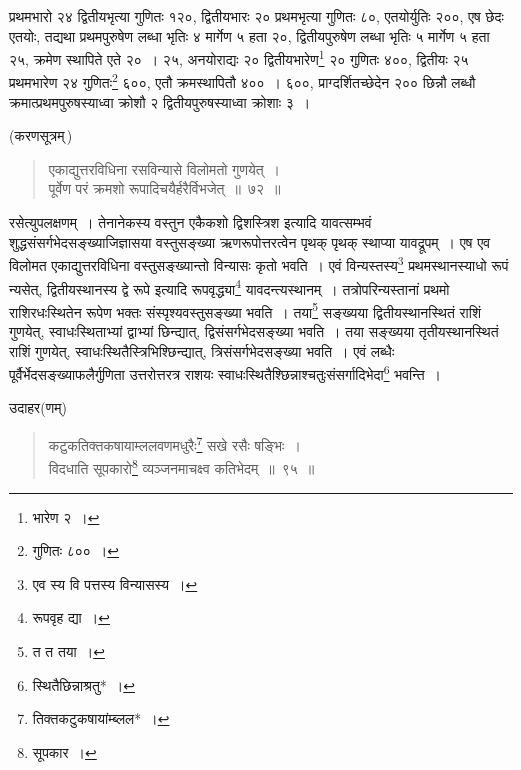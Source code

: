 \documentclass[10pt, openany]{book}
\begin{document}
{{{प्रथमभारो २४ द्वितीयभृत्या गुणितः १२०, द्वितीयभारः २० प्रथमभृत्या
गुणितः ८०,}
{एतयोर्युतिः २००, एष छेदः एतयोः, तद्यथा प्रथमपुरुषेण लब्धा भृतिः ४
मार्गेण ५ हता २०,}
{द्वितीयपुरुषेण लब्धा भृतिः ५ मार्गेण ५ हता २५, क्रमेण स्थापिते एते २०~।
२५, अनयोराद्यः}
{२० द्वितीयभारेण\renewcommand{\thefootnote}{\s ४}\footnote{\s *भारेण २~।} २० गुणितः ४००, द्वितीयः २५ प्रथमभारेण २४
गुणितः\renewcommand{\thefootnote}{\s ५}\footnote{\s गुणितः ८००~।} ६००, एतौ}
{क्रमस्थापितौ ४००~। ६००, प्राग्दर्शितच्छेदेन २०० छिन्नौ लब्धौ
क्रमात्प्रथमपुरुषस्याध्वा क्रोशौ}
{२ द्वितीयपुरुषस्याध्वा क्रोशाः ३~।}
\vspace{3mm}

{(करणसूत्रम्\textendash \,)}

 \label{72}
\begin{quote}
 {\bs एकाद्युत्तरविधिना रसविन्यासे विलोमतो गुणयेत्~। \\
 पूर्वेण परं क्रमशो रूपादिचयैर्हरैर्विभजेत्~॥~७२~॥}\end{quote}

{रसेत्युपलक्षणम्~। तेनानेकस्य वस्तुन एकैकशो द्विशस्त्रिश इत्यादि
यावत्सम्भवं शुद्धसंसर्गभेदसङ्ख्याजिज्ञासया वस्तुसङ्ख्या ऋणरूपोत्तरत्वेन पृथक् पृथक्
स्थाप्या यावद्रूपम्~।}
{एष एव विलोमत एकाद्युत्तरविधिना वस्तुसङ्ख्यान्तो विन्यासः कृतो भवति~।
एवं विन्यस्तस्य\renewcommand{\thefootnote}{\s ६}\footnote{\s एव स्य वि पत्तस्य विन्यासस्य~।}}
{प्रथमस्थानस्याधो रूपं न्यसेत्, द्वितीयस्थानस्य द्वे रूपे इत्यादि
रूपवृद्ध्या\renewcommand{\thefootnote}{\s ७}\footnote{\s रूपवृह द्या~।} यावदन्त्यस्थानम्~।}
{तत्रोपरिन्यस्तानां प्रथमो राशिरधःस्थितेन रूपेण भक्तः
संस्पृश्यवस्तुसङ्ख्या भवति~। तया\renewcommand{\thefootnote}{\s ८}\footnote{\s त त तया~।}}
{सङ्ख्यया द्वितीयस्थानस्थितं राशिं गुणयेत्, स्वाधःस्थिताभ्यां द्वाभ्यां
छिन्द्यात्, द्विसंसर्गभेदसङ्ख्या भवति~। तया सङ्ख्यया तृतीयस्थानस्थितं राशिं गुणयेत्,
स्वाधःस्थितैस्त्रिभिश्छिन्द्यात्,}
{त्रिसंसर्गभेदसङ्ख्या भवति~। एवं लब्धैः पूर्वैर्भेदसङ्ख्याफलैर्गुणिता
उत्तरोत्तरत्र राशयः स्वाधःस्थितैश्छिन्नाश्चतुःसंसर्गादिभेदा\renewcommand{\thefootnote}{\s ९}\footnote{\s *स्थितैछिन्नाश्रतु*~।} भवन्ति~।}

\newpage

{उदाहर(णम्)\textemdash}

\begin{quote}
{\eg कटुकतिक्तकषायाम्ललवणमधुरैः\renewcommand{\thefootnote}{\s १}\footnote{\s तिक्तकटुकषायांम्ब्लल*~।} सखे रसैः षङ्भिः~। \\
 विदधाति सूपकारो\renewcommand{\thefootnote}{\s २}\footnote{\s सूपकार~।} व्यञ्जनमाचक्ष्व कतिभेदम्~॥~९५~॥}\end{quote}

}}
\end{document}

